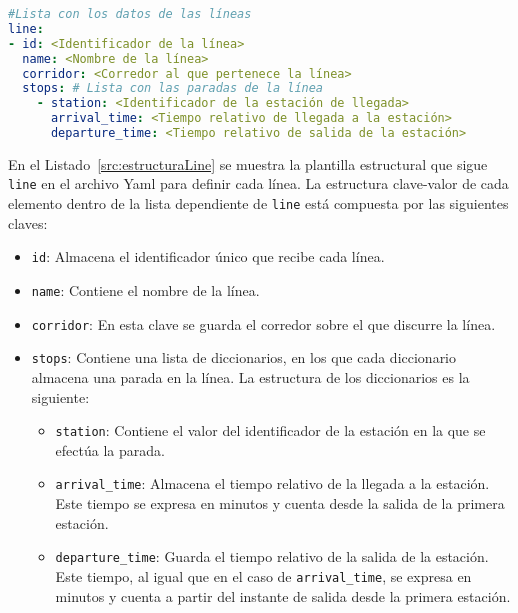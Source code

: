 \begin{lstlisting}[language=YAML,
                   frame=none,
                   numbers=none,
                   basicstyle=\ttfamily\normalsize,
                   caption={Estructura de la clave raíz \texttt{line}},
                   label=src:estructuraLine,
                   inputencoding=utf8]
#Lista con los datos de las líneas
line:
- id: <Identificador de la línea>
  name: <Nombre de la línea>
  corridor: <Corredor al que pertenece la línea>
  stops: # Lista con las paradas de la línea
    - station: <Identificador de la estación de llegada>
      arrival_time: <Tiempo relativo de llegada a la estación>
      departure_time: <Tiempo relativo de salida de la estación>
\end{lstlisting}

En el Listado~\ref{src:estructuraLine} se muestra la plantilla estructural que sigue \texttt{line} en el archivo \acrshort{Yaml} para definir cada línea. La estructura clave-valor de cada elemento dentro de la lista dependiente de \texttt{line} está compuesta por las siguientes claves:

\begin{itemize}
    \item \texttt{id}: Almacena el identificador único que recibe cada línea.
    \item \texttt{name}: Contiene el nombre de la línea.
    \item \texttt{corridor}: En esta clave se guarda el corredor sobre el que discurre la línea.
    \item \texttt{stops}: Contiene una lista de diccionarios, en los que cada diccionario almacena una parada en la línea. La estructura de los diccionarios es la siguiente:
    \begin{itemize}
        \item \texttt{station}: Contiene el valor del identificador de la estación en la que se efectúa la parada.
        \item \texttt{arrival\_time}: Almacena el tiempo relativo de la llegada a la estación. Este tiempo se expresa en minutos y cuenta desde la salida de la primera estación. 
        \item \texttt{departure\_time}: Guarda el tiempo relativo de la salida de la estación. Este tiempo, al igual que en el caso de \texttt{arrival\_time}, se expresa en minutos y cuenta a partir del instante de salida desde la primera estación. 
    \end{itemize}
\end{itemize}

